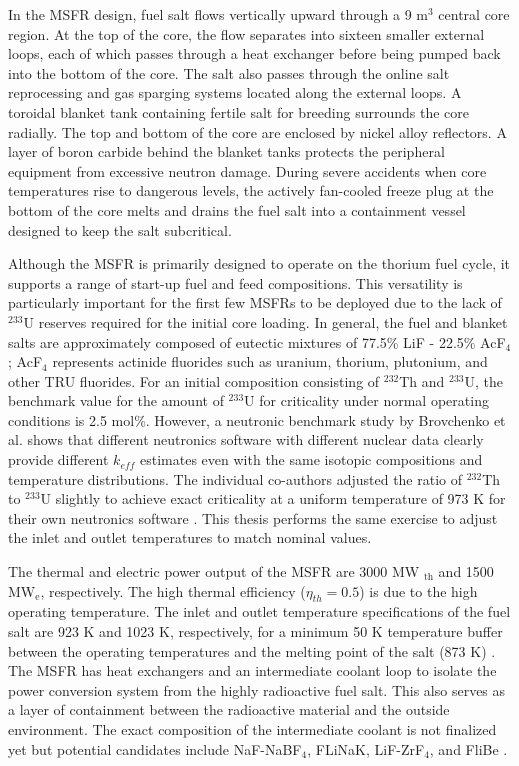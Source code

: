 In the \gls{MSFR} design, fuel salt flows vertically upward through a 9 m$^3$
central core region. At the top of the core, the flow separates into sixteen
smaller external loops, each of which passes through a heat exchanger before
being pumped back into the bottom of the core. The salt also passes through
the online salt reprocessing and gas sparging systems located along the
external loops. A toroidal blanket tank containing fertile salt for breeding
surrounds the core radially. The top and bottom of the core are enclosed
by nickel alloy reflectors. A layer of boron carbide behind the blanket tanks
protects the peripheral equipment from excessive neutron damage. During severe
accidents when core temperatures rise to dangerous levels, the actively
fan-cooled freeze plug at the bottom of the core melts and drains the fuel
salt into a containment vessel designed to keep the salt subcritical. 

Although the \gls{MSFR} is primarily designed to operate on the thorium fuel
cycle, it supports a range of start-up fuel and feed compositions. This
versatility is particularly important for the first few \glspl{MSFR} to be
deployed due to the lack of $^{233}$U reserves required for the initial core
loading. In general, the fuel and blanket salts are approximately composed of
eutectic mixtures of 77.5\% LiF - 22.5\% AcF$_4$; AcF$_4$ represents
actinide fluorides such as uranium, thorium, plutonium, and other \gls{TRU}
fluorides. For an initial composition consisting of $^{232}$Th and $^{233}$U,
the benchmark value for the amount of $^{233}$U for criticality under
normal operating conditions is 2.5 mol\%. However, a neutronic benchmark
study by Brovchenko et al. \cite{brovchenko_neutronic_2019} shows that
different neutronics software with different nuclear data clearly provide
different $k_{eff}$ estimates even with the same isotopic compositions and
temperature distributions. The individual co-authors adjusted the
ratio of $^{232}$Th to $^{233}$U slightly to achieve exact criticality at a
uniform temperature of 973 K for their own neutronics software
\cite{brovchenko_neutronic_2019}. This thesis
performs the same exercise to adjust the inlet and outlet temperatures to
match nominal values.

The thermal and electric power output of the \gls{MSFR} are 3000 MW
$_{\text{th}}$ and 1500 MW$_{\text{e}}$, respectively. The high thermal
efficiency ($\eta_{th}=0.5$) is due to the high operating
temperature. The inlet and outlet temperature
specifications of the fuel salt are 923 K and 1023 K, respectively, for a
minimum 50 K temperature buffer between the
operating temperatures and the melting point of the salt (873 K)
\cite{euratom_final_2015}. The \gls{MSFR} has
heat exchangers and an intermediate coolant loop to isolate the power
conversion system from the highly radioactive fuel salt. This also serves as
a layer of containment between the radioactive material and the outside
environment. The exact composition of the intermediate coolant is not
finalized yet but potential candidates include NaF-NaBF$_4$, FLiNaK,
LiF-ZrF$_4$, and FliBe \cite{merle_concept_2017}.

